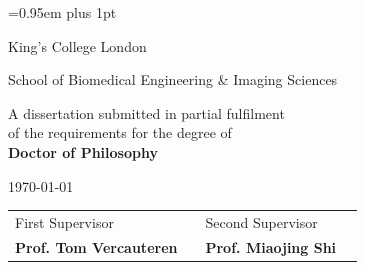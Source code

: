 \begin{titlepage}

\pagestyle{empty}


\vspace*{1.5cm}

\begin{center}
	{\LARGE{\theauthor}\par}
\end{center}
\vspace{0.6cm}
\begin{center}
        {\huge\baselineskip=0.95em plus 1pt \expandafter{
        \textbf{\thetitle}
        \par}}
\end{center}


\vspace{3cm}

\begin{center}
	\LARGE{\expandafter{\textrm{King's College London}}}\par
	\expandafter{\Large{School of Biomedical Engineering \& Imaging Sciences}\par}
\end{center}

\vspace{1.5cm}

\begin{center}
	A dissertation submitted in partial fulfilment 
	\\
	of the requirements for the degree of
	\\ 
	\textbf{Doctor of Philosophy}	
\end{center}

\vspace{0.2cm}
\begin{center}
	\today
\end{center}

\vspace{1.0cm}

\begin{center}
\begin{tabular}{l p{3.3cm} l l}
	
First Supervisor & & Second Supervisor \\
\textbf{Prof. Tom Vercauteren} & & \textbf{Prof. Miaojing Shi}  \\
	
\end{tabular}
\end{center}

\end{titlepage} 
